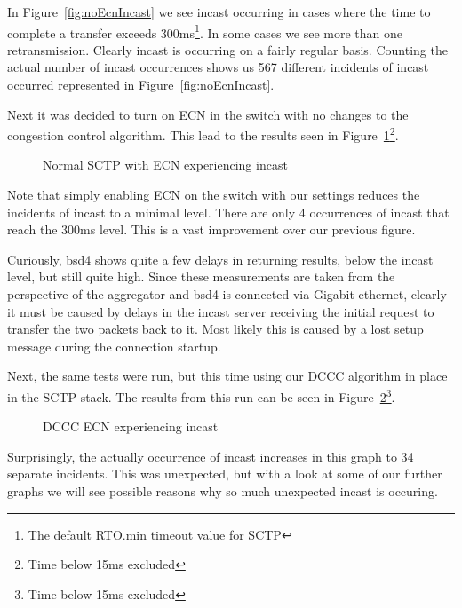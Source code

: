\documentclass[12pt]{article}
\begin{document}
In Figure~\ref{fig:noEcnIncast} we see incast occurring in cases where the time to complete a transfer exceeds
300ms\footnote{The default RTO.min timeout value for SCTP}. In some cases we see more than
one retransmission. Clearly incast is occurring on a fairly regular basis. Counting the actual number
of incast occurrences shows us 567 different incidents of incast occurred represented in Figure~\ref{fig:noEcnIncast}.

\newpage

Next it was decided to turn on ECN in the switch with no changes to the congestion control algorithm. This
lead to the results seen in Figure~\ref{fig:ecnIncast}\footnote{Time below 15ms excluded}.

\begin{figure}[h]
\centering
{}
\caption{Normal SCTP with ECN experiencing incast}
\label{fig:ecnIncast}
\end{figure}


Note that simply enabling ECN on the switch with our settings reduces the incidents of incast to a minimal
level. There are only 4 occurrences of incast that reach the 300ms level. This is a vast improvement over
our previous figure.  

Curiously,  bsd4 shows quite a few delays in returning results, below the incast level, 
but still quite high. Since these measurements are taken from the perspective of the aggregator and
bsd4 is connected via Gigabit ethernet, clearly it must be caused by delays in the incast server
receiving the initial request to transfer the two packets back to it. Most likely this is caused by
a lost setup message during the connection startup.

\newpage

Next, the same tests were run, but this time using our DCCC algorithm in place in the SCTP stack. The
results from this run can be seen in Figure~\ref{fig:dcccIncast}\footnote{Time below 15ms excluded}.

\begin{figure}[h]
\centering
{}
\caption{DCCC ECN experiencing incast}
\label{fig:dcccIncast}
\end{figure}


Surprisingly, the actually occurrence of incast increases in this graph to 34 separate incidents. This
was unexpected, but with a look at some of our further graphs we will see possible
reasons why so much unexpected incast is occuring.
\end{document}
